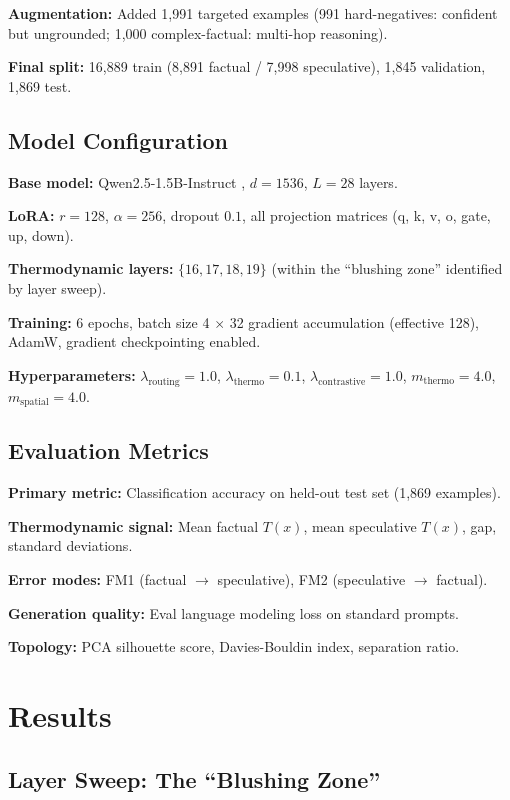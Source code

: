 \documentclass[11pt,a4paper]{article}
\begin{document}
\textbf{Augmentation:} Added 1,991 targeted examples (991 hard-negatives: confident but ungrounded; 1,000 complex-factual: multi-hop reasoning).

\textbf{Final split:} 16,889 train (8,891 factual / 7,998 speculative), 1,845 validation, 1,869 test.

\subsection{Model Configuration}

\textbf{Base model:} Qwen2.5-1.5B-Instruct \citep{qwen2024}, $d=1536$, $L=28$ layers.

\textbf{LoRA:} $r=128$, $\alpha=256$, dropout $0.1$, all projection matrices (q, k, v, o, gate, up, down).

\textbf{Thermodynamic layers:} $\{16, 17, 18, 19\}$ (within the ``blushing zone'' identified by layer sweep).

\textbf{Training:} 6 epochs, batch size 4 $\times$ 32 gradient accumulation (effective 128), AdamW, gradient checkpointing enabled.

\textbf{Hyperparameters:} $\lambda_\text{routing} = 1.0$, $\lambda_\text{thermo} = 0.1$, $\lambda_\text{contrastive} = 1.0$, $m_\text{thermo} = 4.0$, $m_\text{spatial} = 4.0$.

\subsection{Evaluation Metrics}

\textbf{Primary metric:} Classification accuracy on held-out test set (1,869 examples).

\textbf{Thermodynamic signal:} Mean factual $T(x)$, mean speculative $T(x)$, gap, standard deviations.

\textbf{Error modes:} FM1 (factual $\rightarrow$ speculative), FM2 (speculative $\rightarrow$ factual).

\textbf{Generation quality:} Eval language modeling loss on standard prompts.

\textbf{Topology:} PCA silhouette score, Davies-Bouldin index, separation ratio.

\section{Results}

\subsection{Layer Sweep: The ``Blushing Zone''}
\end{document}
